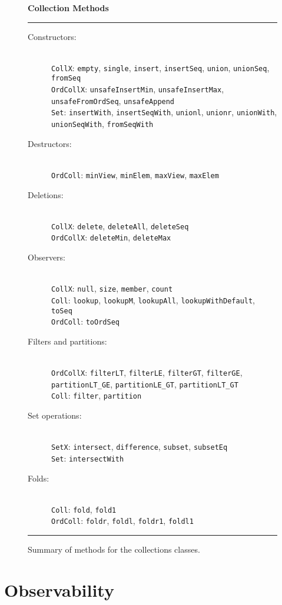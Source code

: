 \documentclass{report}
\newcommand{\cd}{\texttt}
\newcommand{\nl}{\hspace*{0pt}\\}
\begin{document}
\begin{figure}
\begin{center}
\large\bfseries Collection Methods
\end{center}
\hrule
\begin{description}
\item[Constructors:] \nl
  \cd{CollX}: 
    \cd{empty}, \cd{single}, \cd{insert}, \cd{insertSeq}, \cd{union}, \cd{unionSeq}, \cd{fromSeq} \\
  \cd{OrdCollX}: \cd{unsafeInsertMin}, \cd{unsafeInsertMax}, \cd{unsafeFromOrdSeq}, \cd{unsafeAppend} \\
  \cd{Set}: \cd{insertWith}, \cd{insertSeqWith}, \cd{unionl}, \cd{unionr}, \cd{unionWith}, \cd{unionSeqWith}, \cd{fromSeqWith}
\item[Destructors:] \nl
  \cd{OrdColl}: \cd{minView}, \cd{minElem}, \cd{maxView}, \cd{maxElem} 
\item[Deletions:] \nl
  \cd{CollX}: \cd{delete}, \cd{deleteAll}, \cd{deleteSeq} \\
  \cd{OrdCollX}: \cd{deleteMin}, \cd{deleteMax}
\item[Observers:] \nl
  \cd{CollX}: \cd{null}, \cd{size}, \cd{member}, \cd{count} \\
  \cd{Coll}: \cd{lookup}, \cd{lookupM}, \cd{lookupAll}, \cd{lookupWithDefault}, \cd{toSeq} \\
  \cd{OrdColl}: \cd{toOrdSeq}
\item[Filters and partitions:] \nl
  \cd{OrdCollX}:
  \cd{filterLT}, \cd{filterLE}, \cd{filterGT}, \cd{filterGE}, \\
  \hspace*{20pt}
  \cd{partitionLT\_GE}, \cd{partitionLE\_GT}, \cd{partitionLT\_GT} \\
  \cd{Coll}: \cd{filter}, \cd{partition} 
\item[Set operations:] \nl
  \cd{SetX}: \cd{intersect}, \cd{difference}, \cd{subset}, \cd{subsetEq} \\
  \cd{Set}: \cd{intersectWith}
\item[Folds:] \nl
  \cd{Coll}: \cd{fold}, \cd{fold1} \\
  \cd{OrdColl}: \cd{foldr}, \cd{foldl}, \cd{foldr1}, \cd{foldl1}
\end{description}
\hrule
\caption{Summary of methods for the collections classes.}
\label{coll-methods}
\end{figure}

\section{Observability} \label{observability}
\end{document}
